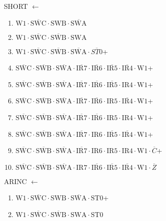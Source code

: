\documentclass[UTF8]{ctexart}
\begin{document}
SHORT $\leftarrow$
\begin{enumerate}[\indent\indent]
	\item $\text{W1} \cdot \overline{\text{SWC}} \cdot \text{SWB} \cdot \overline{\text{SWA}}$
	\item $\text{W1} \cdot \overline{\text{SWC}} \cdot \overline{\text{SWB}} \cdot \text{SWA}$
	\item $\text{W1} \cdot \overline{\text{SWC}} \cdot \overline{\text{SWB}} \cdot \overline{\text{SWA}} \cdot \overline{ST0}$+
	\item $\overline{\text{SWC}} \cdot\overline{\text{SWB}}\cdot \overline{\text{SWA}} \cdot \overline{\text{IR7}} \cdot \overline{\text{IR6}} \cdot \overline{\text{IR5}} \cdot \overline{\text{IR4}} \cdot \text{W1}$+
	\item $\overline{\text{SWC}} \cdot\overline{\text{SWB}}\cdot \overline{\text{SWA}} \cdot \overline{\text{IR7}} \cdot \overline{\text{IR6}} \cdot \overline{\text{IR5}} \cdot \text{IR4} \cdot \text{W1}$+
	\item $\overline{\text{SWC}} \cdot\overline{\text{SWB}}\cdot \overline{\text{SWA}} \cdot \overline{\text{IR7}} \cdot \overline{\text{IR6}} \cdot \text{IR5} \cdot \overline{\text{IR4}} \cdot \text{W1}$+
	\item $\overline{\text{SWC}} \cdot\overline{\text{SWB}}\cdot \overline{\text{SWA}} \cdot \overline{\text{IR7}} \cdot \overline{\text{IR6}} \cdot \text{IR5} \cdot \text{IR4} \cdot \text{W1}$+
	\item $\overline{\text{SWC}} \cdot\overline{\text{SWB}}\cdot \overline{\text{SWA}} \cdot \overline{\text{IR7}} \cdot \text{IR6} \cdot \overline{\text{IR5}} \cdot \overline{\text{IR4}} \cdot \text{W1}$+
	\item $\overline{\text{SWC}} \cdot\overline{\text{SWB}}\cdot \overline{\text{SWA}} \cdot \overline{\text{IR7}} \cdot \text{IR6} \cdot \text{IR5} \cdot \text{IR4} \cdot \text{W1} \cdot \overline{C}$+
	\item $\overline{\text{SWC}} \cdot\overline{\text{SWB}}\cdot \overline{\text{SWA}} \cdot \text{IR7} \cdot \overline{\text{IR6}} \cdot \overline{\text{IR5}} \cdot \overline{\text{IR4}} \cdot \text{W1} \cdot \overline{Z}$
\end{enumerate}


ARINC $\leftarrow$
\begin{enumerate}[\indent\indent]
	\item $\text{W1} \cdot \overline{\text{SWC}} \cdot \text{SWB} \cdot \overline{\text{SWA}} \cdot \text{ST0}$+
	\item $\text{W1} \cdot \overline{\text{SWC}} \cdot \overline{\text{SWB}} \cdot \text{SWA} \cdot \text{ST0}$
\end{enumerate}
\end{document}
